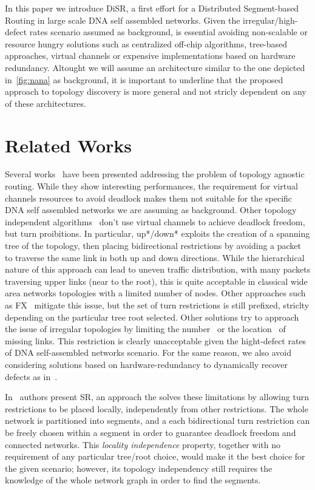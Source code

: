 In this paper we introduce DiSR, a first effort for a Distributed
Segment-based Routing in large scale DNA self assembled networks.
Given the irregular/high-defect rates scenario assumed as background, is essential
avoiding non-scalable or resource hungry solutions such as
centralized off-chip algorithms, tree-based approaches, virtual channels
or expensive implementations based on hardware redundancy.
Altought we will assume an architecture similar to the one depicted
in~\ref{fig:nana} as background, it
is important to underline that the proposed approach to topology
discovery is more general and not stricly dependent on any of these
architectures.


\section{Related Works}

Several works~\cite{TODO7} have been presented addressing the problem of topology
agnostic routing. While they show interesting
performances, the requirement for virtual channels resources 
to avoid deadlock makes them not suitable for the specific DNA self
assembled networks we are assuming as background.
Other topology independent algorithms~\cite{TODO8} don't use virtual channels to
achieve deadlock freedom, but turn proibitions. 
In particular, up*/down* exploits the creation of a spanning tree of the
topology, then placing bidirectional restrictions by avoiding a packet
to traverse the same link in both up and down directions.
While the hierarchical nature of this approach can lead to uneven traffic
distribution, with many packets traversing upper links (near to the
root), this is quite acceptable in classical wide area networks
topologies with a limited number of nodes. Other approaches such as
FX~\cite{TODO9} mitigate this
issue, but the set of turn restrictions is still prefixed,
striclty depending on the particular tree root selected. 
Other solutions try to approach the issue of irregular
topologies by limiting the number~\cite{TODO10} or the
location~\cite{TODO11} of missing links. This
restriction is clearly unacceptable given the hight-defect rates of
DNA self-assembled networks scenario. For the same reason, we also
avoid considering solutions based on hardware-redundancy to
dynamically recover defects as in~\cite{TODO12}. 

In~\cite{mejia_ipdps06} authors present SR, an approach the solves these
limitations by allowing turn restrictions to be placed locally,
independently from other restrictions. The whole network is
partitioned into segments, and a each bidirectional turn
restriction can be freely chosen within a segment in order to guarantee
deadlock freedom and connected networks. This \emph{locality
independence} property, together with no requirement of any particular tree/root
choice, would make it the best choice for the given scenario;
however, its topology independency still requires the knowledge of the
whole network graph in order to find the segments. 


